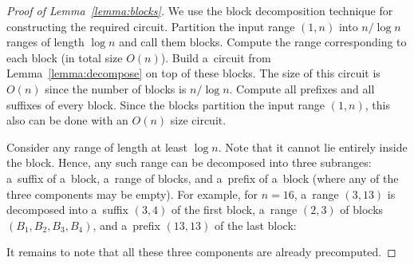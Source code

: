 \documentclass[a4paper,UKenglish,cleveref, autoref]{lipics-v2019}
\begin{document}
\begin{proof}[Proof of Lemma~\ref{lemma:blocks}]
We use the block decomposition technique for
constructing the required circuit.
Partition the input range $(1,n)$ into $n/\log n$ ranges
of length $\log n$ and call them blocks. Compute the range
corresponding to each block (in total size $O(n)$).
Build a~circuit from Lemma~\ref{lemma:decompose} on
top of these blocks. The size of this circuit is $O(n)$ since the
number of blocks is $n/\log n$.
Compute all prefixes and all suffixes of every block. Since
the blocks partition the input range $(1,n)$, this also can be done
with an $O(n)$ size circuit.

Consider any range of length at least $\log n$. Note that it
cannot lie entirely inside the block. Hence, any such range can be
decomposed into three subranges: a~suffix of a~block, a~range
of blocks, and a~prefix of a~block
(where any of the three components may be empty). For example, for $n=16$,
a~range $(3,13)$ is decomposed into a~suffix $(3,4)$ of the
first block,
a~range $(2,3)$ of blocks $(B_1, B_2, B_3, B_4)$, and a~prefix $(13,13)$ of
the last block:
\begin{center}
\end{center}
It remains to note that all these three components are already precomputed.
\end{proof}
\end{document}
